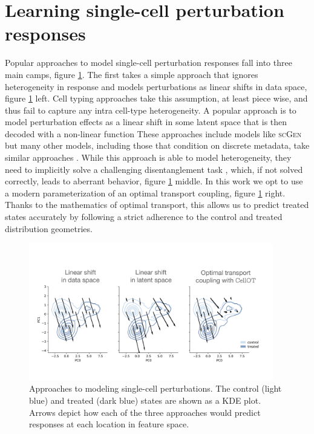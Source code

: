 \section{Learning single-cell perturbation responses}
Popular approaches to model single-cell perturbation responses fall into three main camps, figure \ref{fig:arrows}.
The first takes a simple approach that ignores heterogeneity in response and models perturbations as linear shifts in data space, figure \ref{fig:arrows} left.
Cell typing approaches take this assumption, at least piece wise, and thus fail to capture any intra cell-type heterogeneity.
A popular approach is to model perturbation effects as a linear shift in some latent space that is then decoded with a non-linear function
These approaches include models like \textsc{scGen} \cite{lotfollahi2019} but many other models, including those that condition on discrete metadata,
take similar approaches \cite{lopez2018, lotfollahi2022, lotfollahi2023, bereket2023}.
While this approach is able to model heterogeneity, they need to implicitly solve a challenging disentanglement task \cite{locatello2019}, which, if not solved correctly, leads to aberrant behavior, figure \ref{fig:arrows} middle. 
In this work we opt to use a modern parameterization of an optimal transport coupling, figure \ref{fig:arrows} right.
Thanks to the mathematics of optimal transport, this allows us to predict treated states accurately by following a strict adherence to the control and treated distribution geometries.

\begin{figure}[ht]
  \begin{center}
    \includegraphics[width=0.95\textwidth]{figures/cellot-methods/arrow-cartoons.pdf}
  \end{center}
  \caption{
    Approaches to modeling single-cell perturbations.
    The control (light blue) and treated (dark blue) states are shown as a KDE plot.
    Arrows depict how each of the three approaches would predict responses at each location in feature space.
  }
  \label{fig:arrows}
\end{figure}


